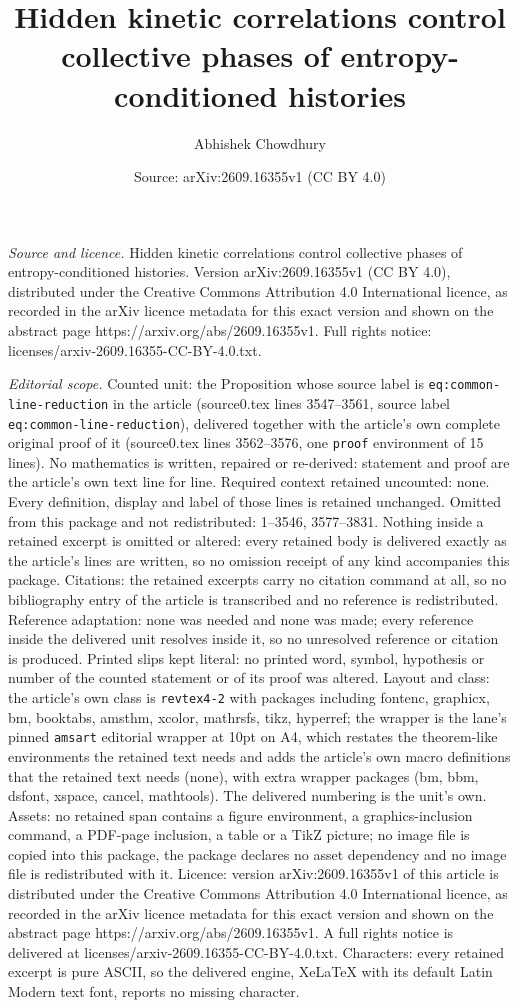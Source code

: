 \documentclass[10pt,a4paper]{amsart}
\title[Hidden kinetic correlations control collective phases of ent]{Hidden kinetic correlations control collective phases of entropy-conditioned histories}
\author{Abhishek Chowdhury}
\date{Source: arXiv:2609.16355v1 (CC BY 4.0)}
\begin{document}
\maketitle

\noindent\emph{Source and licence.} Hidden kinetic correlations control collective phases of entropy-conditioned histories. Version arXiv:2609.16355v1 (CC BY 4.0), distributed under the Creative Commons Attribution 4.0 International licence, as recorded in the arXiv licence metadata for this exact version and shown on the abstract page https://arxiv.org/abs/2609.16355v1. Full rights notice: licenses/arxiv-2609.16355-CC-BY-4.0.txt.\par\smallskip

\noindent\textit{Editorial scope.} Counted unit: the Proposition whose source label is \texttt{eq:common-line-reduction} in the article (source0.tex lines 3547--3561, source label \texttt{eq:common-line-reduction}), delivered together with the article's own complete original proof of it (source0.tex lines 3562--3576, one \texttt{proof} environment of 15 lines). No mathematics is written, repaired or re-derived: statement and proof are the article's own text line for line. Required context retained uncounted: none. Every definition, display and label of those lines is retained unchanged. Omitted from this package and not redistributed: 1--3546, 3577--3831. Nothing inside a retained excerpt is omitted or altered: every retained body is delivered exactly as the article's lines are written, so no omission receipt of any kind accompanies this package. Citations: the retained excerpts carry no citation command at all, so no bibliography entry of the article is transcribed and no reference is redistributed. Reference adaptation: none was needed and none was made; every reference inside the delivered unit resolves inside it, so no unresolved reference or citation is produced. Printed slips kept literal: no printed word, symbol, hypothesis or number of the counted statement or of its proof was altered. Layout and class: the article's own class is \texttt{revtex4-2} with packages including fontenc, graphicx, bm, booktabs, amsthm, xcolor, mathrsfs, tikz, hyperref; the wrapper is the lane's pinned \texttt{amsart} editorial wrapper at 10pt on A4, which restates the theorem-like environments the retained text needs and adds the article's own macro definitions that the retained text needs (none), with extra wrapper packages (bm, bbm, dsfont, xspace, cancel, mathtools). The delivered numbering is the unit's own. Assets: no retained span contains a figure environment, a graphics-inclusion command, a PDF-page inclusion, a table or a TikZ picture; no image file is copied into this package, the package declares no asset dependency and no image file is redistributed with it. Licence: version arXiv:2609.16355v1 of this article is distributed under the Creative Commons Attribution 4.0 International licence, as recorded in the arXiv licence metadata for this exact version and shown on the abstract page https://arxiv.org/abs/2609.16355v1. A full rights notice is delivered at licenses/arxiv-2609.16355-CC-BY-4.0.txt. Characters: every retained excerpt is pure ASCII, so the delivered engine, XeLaTeX with its default Latin Modern text font, reports no missing character.
\end{document}
